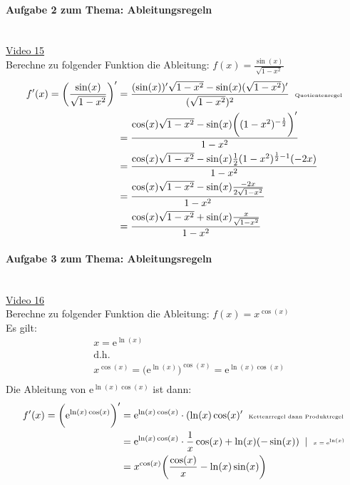 \paragraph{Aufgabe 2 zum Thema: Ableitungsregeln}$  $\vspace*{3mm}\\
\href{https://youtu.be/RJ5ZqJzbv_I}{Video 15}\\
Berechne zu folgender Funktion die Ableitung: $ f(x)=\frac{\sin(x)}{\sqrt{1-x^2}} $\\
\begin{align*}
f'(x)=\bigg(\frac{\sin(x)}{\sqrt{1-x^2}}\bigg)'&=\frac{(\sin(x))'\sqrt{1-x^2}-\sin(x)(\sqrt{1-x^2})'}{(\sqrt{1-x^2})^2}\;\;\text{\tiny Quotientenregel }\\
&=\frac{\cos(x)\sqrt{1-x^2}-\sin(x)\bigg((1-x^2)^{-\frac{1}{2}}\bigg)'}{1-x^2}\\
&=\frac{\cos(x)\sqrt{1-x^2}-\sin(x)\frac{1}{2}(1-x^2)^{\frac{1}{2}-1}(-2x)}{1-x^2}\\
&=\frac{\cos(x)\sqrt{1-x^2}-\sin(x)\frac{-2x}{2\sqrt{1-x^2}}}{1-x^2}\\
&=\frac{\cos(x)\sqrt{1-x^2}+\sin(x)\frac{x}{\sqrt{1-x^2}}}{1-x^2}\\
\end{align*}
\paragraph{Aufgabe 3 zum Thema: Ableitungsregeln}$  $\vspace*{3mm}\\
\href{https://youtu.be/uPo2hsEsAdU}{Video 16}\\
Berechne zu folgender Funktion die Ableitung: $ f(x)=x^{\cos(x)} $\\
Es gilt:\\
\begin{align*}
&x=\mathrm{e}^{\ln(x)}\\
&\text{d.h. }\\
&x^{\cos(x)}=\big(\mathrm{e}^{\ln(x)}\big)^{\cos(x)}=\mathrm{e}^{\ln(x)\cos(x)}\\
\end{align*}
Die Ableitung von $\mathrm{e}^{\ln(x)\cos(x)}  $ ist dann:\\
\begin{align*}
f'(x)=\bigg(\mathrm{e}^{\ln(x)\cos(x)}\bigg)'&=\mathrm{e}^{\ln(x)\cos(x)}\cdot (\ln(x)\cos(x)'\;\;\text{\tiny Kettenrregel dann Produktregel }\\
&=\mathrm{e}^{\ln(x)\cos(x)}\cdot \frac{1}{x}\cos(x)+\ln(x)(-\sin(x))\;\;|\;\;\text{\tiny $ x=\mathrm{e}^{\ln(x)} $ }\\
&=x^{\cos(x)}\bigg(\frac{\cos(x)}{x}-\ln(x)\sin(x)\bigg)\\
\end{align*}
